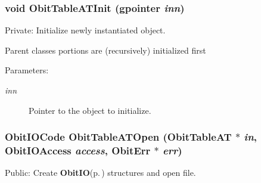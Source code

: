 \subsubsection{\setlength{\rightskip}{0pt plus 5cm}void Obit\-Table\-ATInit (gpointer {\em inn})}\label{ObitTableAT_8c_a8}


Private: Initialize newly instantiated object. 

Parent classes portions are (recursively) initialized first \begin{Desc}
\item[Parameters:]
\begin{description}
\item[{\em inn}]Pointer to the object to initialize. \end{description}
\end{Desc}
\subsubsection{\setlength{\rightskip}{0pt plus 5cm}Obit\-IOCode Obit\-Table\-ATOpen ({\bf Obit\-Table\-AT} $\ast$ {\em in}, Obit\-IOAccess {\em access}, {\bf Obit\-Err} $\ast$ {\em err})}\label{ObitTableAT_8c_a21}


Public: Create {\bf Obit\-IO}{\rm (p.\,\pageref{structObitIO})} structures and open file. 

